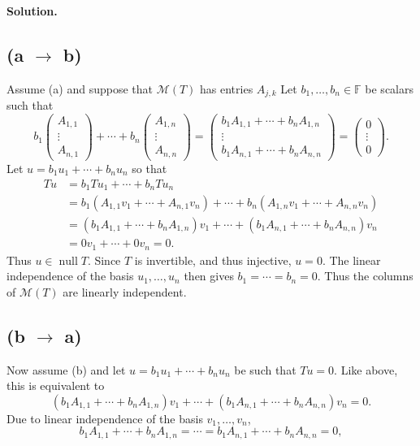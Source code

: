 \documentclass[11pt]{article}
\newcommand{\SolutionAnnounce}{\noindent\textbf{Solution.}\par\medskip}
\begin{document}
\begin{solutionBox}
\SolutionAnnounce
\doublespacing

\subsection*{(a $\to$ b)}
Assume (a) and suppose that $\mathcal{M}(T)$ has entries $A_{j,k}$ 
Let $b_1,\dots,b_n\in\mathbb{F}$ be scalars such that
\[
b_1\begin{pmatrix}A_{1,1}\\ \vdots\\ A_{n,1}\end{pmatrix}
+\cdots+
b_n\begin{pmatrix}A_{1,n}\\ \vdots\\ A_{n,n}\end{pmatrix}
=
\begin{pmatrix}b_1A_{1,1}+\cdots+b_nA_{1,n}\\ \vdots\\ b_1A_{n,1}+\cdots+b_nA_{n,n}\end{pmatrix}
=
\begin{pmatrix}0\\ \vdots\\ 0\end{pmatrix}.
\]
Let $u=b_1u_1+\cdots+b_nu_n$ so that
\begin{align*}
Tu
&= b_1Tu_1+\cdots+b_nTu_n \\
&= b_1(A_{1,1}v_1+\cdots+A_{n,1}v_n)+\cdots+b_n(A_{1,n}v_1+\cdots+A_{n,n}v_n)\\
&= (b_1A_{1,1}+\cdots+b_nA_{1,n})v_1+\cdots+(b_1A_{n,1}+\cdots+b_nA_{n,n})v_n\\
&=0v_1+\cdots+0v_n=0.
\end{align*}
Thus $u\in \operatorname{null}T$. Since $T$ is invertible, and thus injective, $u=0$.
The linear independence of the basis $u_1,\dots,u_n$ then gives $b_1=\cdots=b_n=0$.
Thus the columns of $\mathcal{M}(T)$ are linearly independent.

\subsection*{(b $\to$ a)}
Now assume (b) and let $u=b_1u_1+\cdots+b_nu_n$ be such that $Tu=0$.
Like above, this is equivalent to
\[
(b_1A_{1,1}+\cdots+b_nA_{1,n})v_1+\cdots+(b_1A_{n,1}+\cdots+b_nA_{n,n})v_n=0.
\]
Due to linear independence of the basis $v_1,\dots,v_n$,
\[
b_1A_{1,1}+\cdots+b_nA_{1,n}=\cdots=b_1A_{n,1}+\cdots+b_nA_{n,n}=0,
\]


\end{solutionBox}
\end{document}
